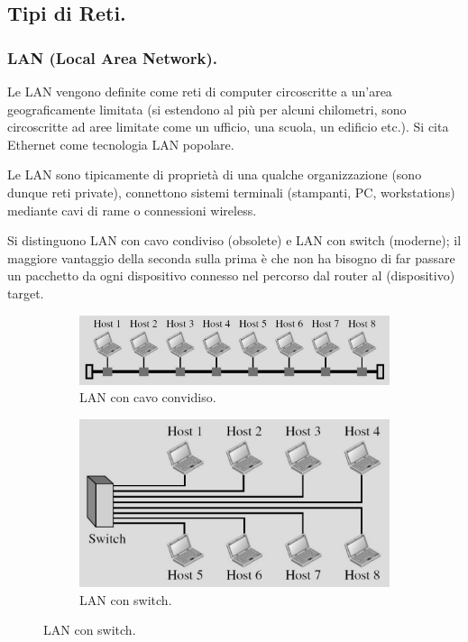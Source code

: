 \documentclass[11pt, italian, openany]{book}
\begin{document}
\begin{sloppypar}
\subsection{Tipi di Reti.}
\subsubsection*{LAN (Local Area Network).}
Le LAN vengono definite come reti di computer circoscritte a un'area geograficamente limitata (si estendono al pi\`u per alcuni chilometri,
sono circoscritte ad aree limitate come un ufficio, una scuola, un edificio etc.). Si cita Ethernet come tecnologia LAN popolare.

Le LAN sono tipicamente di propriet\`a di una qualche organizzazione (sono dunque reti private), connettono sistemi terminali (stampanti, PC,
workstations) mediante cavi di rame o connessioni wireless.

Si distinguono LAN con cavo condiviso (obsolete) e LAN con switch (moderne); il maggiore vantaggio della seconda sulla prima \`e che non ha
bisogno di far passare un pacchetto da ogni dispositivo connesso nel percorso dal router al (dispositivo) target.

\begin{figure}[h!]
	\begin{subfigure}{0.49 \linewidth} \centering
		\includegraphics[scale=0.35]{images/lan-obsoleta.png}
		\caption{LAN con cavo convidiso.}
	\end{subfigure}
	\begin{subfigure}{0.49 \linewidth} \centering
		\includegraphics[scale=0.35]{images/lan-moderna.png}
		\caption{LAN con switch.}
	\end{subfigure}
\end{figure}


\end{sloppypar}
\end{document}
